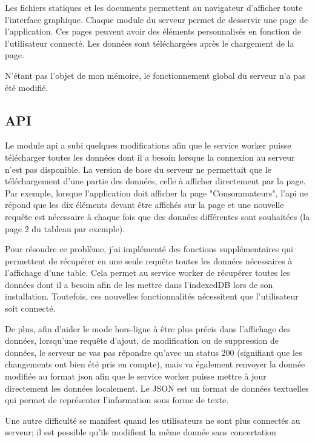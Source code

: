 \documentclass{EPL-master-thesis-covers-FR}
\begin{document}
				Les fichiers statiques et les documents permettent au navigateur d'afficher toute l'interface graphique. Chaque module du serveur permet de desservir une page de l'application. Ces pages peuvent avoir des éléments personnalisés en fonction de l'utilisateur connecté. Les données sont téléchargées après le chargement de la page.
				
				N'étant pas l'objet de mon mémoire, le fonctionnement global du serveur n'a pas été modifié.
				
				
			\subsection*{API}
				\label{sec:api}
				Le module \gls{api} a subi quelques modifications afin que le service worker puisse télécharger toutes les données dont il a besoin lorsque la connexion au serveur n'est pas disponible. La version de base du serveur ne permettait que le téléchargement d'une partie des données, celle à afficher directement par la page. Par exemple, lorsque l'application doit afficher la page "Consommateurs", l'\gls{api} ne répond que les dix éléments devant être affichés sur la page et une nouvelle requête est nécessaire à chaque fois que des données différentes sont souhaitées (la page 2 du tableau par exemple).
				
				Pour résoudre ce problème, j'ai implémenté des fonctions supplémentaires qui permettent de récupérer en une seule requête toutes les données nécessaires à l'affichage d'une table. Cela permet au service worker de récupérer toutes les données dont il a besoin afin de les mettre dans l'indexedDB lors de son installation. Toutefois, ces nouvelles fonctionnalités nécessitent que l'utilisateur soit connecté.
				
				De plus, afin d'aider le mode hors-ligne à être plus précis dans l'affichage des données, lorsqu'une requête d'ajout, de modification ou de suppression de données, le serveur ne vas pas répondre qu'avec un status 200 (signifiant que les changements ont bien été pris en compte), mais va également renvoyer la donnée modifiée au format \gls{json} afin que le service worker puisse mettre à jour directement les données localement. Le JSON est un format de données textuelles qui permet de représenter l'information sous forme de texte. 
				
				Une autre difficulté se manifest quand les utilisateurs ne sont plus connectés au serveur; il est possible qu'ils modifient la même donnée sans concertation
				
\end{document}
